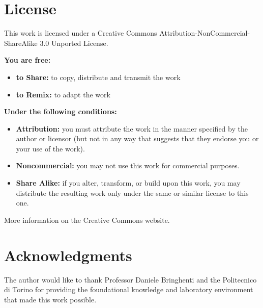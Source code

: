 \section*{License}

This work is licensed under a Creative Commons Attribution-NonCommercial-ShareAlike 3.0 Unported License.

\textbf{You are free:}
\begin{itemize}
    \item \textbf{to Share:} to copy, distribute and transmit the work
    \item \textbf{to Remix:} to adapt the work
\end{itemize}

\textbf{Under the following conditions:}
\begin{itemize}
    \item \textbf{Attribution:} you must attribute the work in the manner specified by the author or licensor (but not in any way that suggests that they endorse you or your use of the work).
    \item \textbf{Noncommercial:} you may not use this work for commercial purposes.
    \item \textbf{Share Alike:} if you alter, transform, or build upon this work, you may distribute the resulting work only under the same or similar license to this one.
\end{itemize}

More information on the Creative Commons website.

\section*{Acknowledgments}

The author would like to thank Professor Daniele Bringhenti and the Politecnico di Torino for providing the foundational knowledge and laboratory environment that made this work possible.
